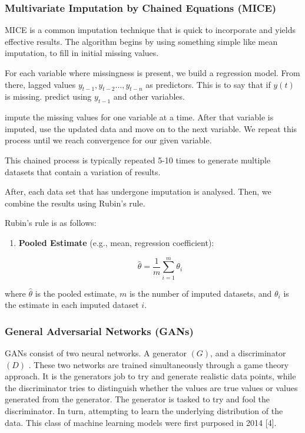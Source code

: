 \documentclass[
]{report}
\begin{document}

\subsubsection{Multivariate Imputation by Chained Equations
(MICE)}\label{multivariate-imputation-by-chained-equations-mice}

MICE is a common imputation technique that is quick to incorporate and
yields effective results. The algorithm begins by using something simple
like mean imputation, to fill in initial missing values.

For each variable where missingness is present, we build a regression
model. From there, lagged values \({y_{t-1}, y_{t-2}...,y_{t-n}}\) as
predictors. This is to say that if \({y(t)}\) is missing. predict using
\(y_{t-1}\) and other variables.

impute the missing values for one variable at a time. After that
variable is imputed, use the updated data and move on to the next
variable. We repeat this process until we reach convergence for our
given variable.

This chained process is typically repeated 5-10 times to generate
multiple datasets that contain a variation of results.

After, each data set that has undergone imputation is analysed. Then, we
combine the results using Rubin's rule.

Rubin's rule is as follows:

\begin{enumerate}
\def\labelenumi{\arabic{enumi}.}
\item
  \textbf{Pooled Estimate} (e.g., mean, regression coefficient):

  \[\hat{\theta} = \frac{1}{m}\sum_{i=1}^{m}\theta_{i}\]
\end{enumerate}

where \(\hat{\theta}\) is the pooled estimate, \(m\) is the number of
imputed datasets, and \(\theta_i\) is the estimate in each imputed
dataset \(i\).

\subsubsection{General Adversarial Networks
(GANs)}\label{general-adversarial-networks-gans}

GANs consist of two neural networks. A generator \((G)\), and a
discriminator \((D)\) . These two networks are trained simultaneously
through a game theory approach. It is the generators job to try and
generate realistic data points, while the discriminator tries to
distinguish whether the values are true values or values generated from
the generator. The generator is tasked to try and fool the
discriminator. In turn, attempting to learn the underlying distribution
of the data. This class of machine learning models were first purposed
in 2014 {[}4{]}.
\end{document}
